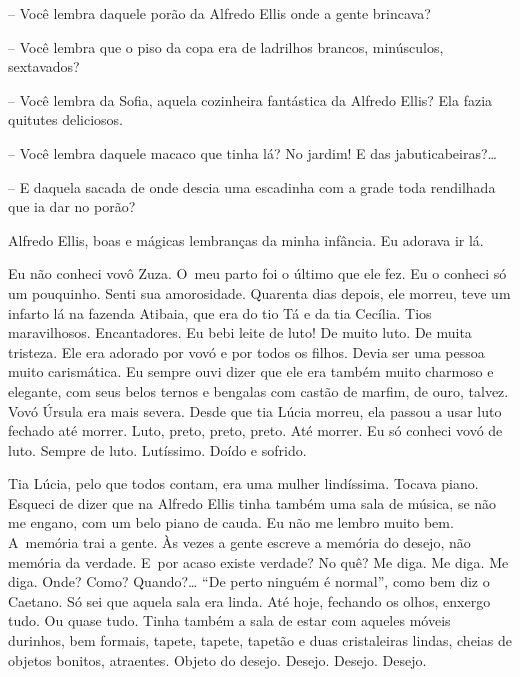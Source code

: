 -- Você lembra daquele porão da Alfredo Ellis onde a gente brincava?

-- Você lembra que o piso da copa era de ladrilhos brancos, minúsculos,
sextavados?

-- Você lembra da Sofia, aquela cozinheira fantástica da Alfredo Ellis?
Ela fazia quitutes deliciosos.

-- Você lembra daquele macaco que tinha lá? No jardim! E das
jabuticabeiras?…

-- E daquela sacada de onde descia uma escadinha com a grade toda
rendilhada que ia dar no porão?

Alfredo Ellis, boas e mágicas lembranças da minha infância. Eu adorava
ir lá.

Eu não conheci vovô Zuza. O~meu parto foi o último que ele fez. Eu o
conheci só um pouquinho. Senti sua amorosidade. Quarenta dias depois,
ele morreu, teve um infarto lá na fazenda Atibaia, que era do tio Tá e
da tia Cecília. Tios maravilhosos. Encantadores. Eu bebi leite de luto!
De muito luto. De muita tristeza. Ele era adorado por vovó e por todos
os filhos. Devia ser uma pessoa muito carismática. Eu sempre ouvi dizer
que ele era também muito charmoso e elegante, com seus belos ternos e
bengalas com castão de marfim, de ouro, talvez. Vovó Úrsula era mais
severa. Desde que tia Lúcia morreu, ela passou a usar luto fechado até
morrer. Luto, preto, preto, preto. Até morrer. Eu só conheci vovó de
luto. Sempre de luto. Lutíssimo. Doído e sofrido.

Tia Lúcia, pelo que todos contam, era uma mulher lindíssima. Tocava
piano. Esqueci de dizer que na Alfredo Ellis tinha também uma sala de
música, se não me engano, com um belo piano de cauda. Eu não me lembro
muito bem. A~memória trai a gente. Às vezes a gente escreve a memória do
desejo, não memória da verdade. E~por acaso existe verdade? No quê? Me
diga. Me diga. Me diga. Onde? Como? Quando?… ``De perto ninguém é
normal'', como bem diz o Caetano. Só sei que aquela sala era linda. Até
hoje, fechando os olhos, enxergo tudo. Ou quase tudo. Tinha também a
sala de estar com aqueles móveis durinhos, bem formais, tapete, tapete,
tapetão e duas cristaleiras lindas, cheias de objetos bonitos,
atraentes. Objeto do desejo. Desejo. Desejo. Desejo.

